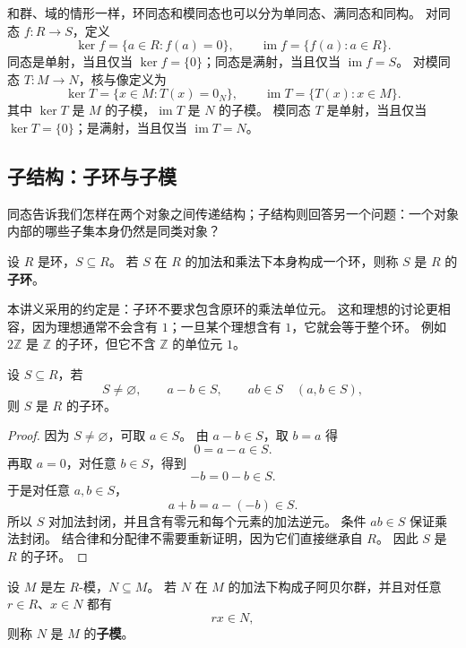 和群、域的情形一样，环同态和模同态也可以分为单同态、满同态和同构。
对同态 $f:R\to S$，定义
\[
\ker f=\{a\in R:f(a)=0\},\qquad
\operatorname{im}f=\{f(a):a\in R\}.
\]
同态是单射，当且仅当 $\ker f=\{0\}$；同态是满射，当且仅当 $\operatorname{im}f=S$。
对模同态 $T:M\to N$，核与像定义为
\[
\ker T=\{x\in M:T(x)=0_N\},\qquad
\operatorname{im}T=\{T(x):x\in M\}.
\]
其中 $\ker T$ 是 $M$ 的子模，$\operatorname{im}T$ 是 $N$ 的子模。
模同态 $T$ 是单射，当且仅当 $\ker T=\{0\}$；是满射，当且仅当 $\operatorname{im}T=N$。

\subsection{子结构：子环与子模}\label{sec:substructures}

同态告诉我们怎样在两个对象之间传递结构；子结构则回答另一个问题：一个对象内部的哪些子集本身仍然是同类对象？

\begin{definition}[子环]\label{def:subring}
设 $R$ 是环，$S\subseteq R$。
若 $S$ 在 $R$ 的加法和乘法下本身构成一个环，则称 $S$ 是 $R$ 的\textbf{子环}。
\end{definition}

本讲义采用的约定是：子环不要求包含原环的乘法单位元。
这和理想的讨论更相容，因为理想通常不会含有 $1$；一旦某个理想含有 $1$，它就会等于整个环。
例如 $2\mathbb Z$ 是 $\mathbb Z$ 的子环，但它不含 $\mathbb Z$ 的单位元 $1$。

\begin{theorem}[子环判定]\label{thm:subring-test}
设 $S\subseteq R$，若
\[
S\neq\varnothing,\qquad a-b\in S,\qquad ab\in S\quad(a,b\in S),
\]
则 $S$ 是 $R$ 的子环。
\end{theorem}

\begin{proof}
因为 $S\neq\varnothing$，可取 $a\in S$。
由 $a-b\in S$，取 $b=a$ 得
\[
0=a-a\in S.
\]
再取 $a=0$，对任意 $b\in S$，得到
\[
-b=0-b\in S.
\]
于是对任意 $a,b\in S$，
\[
a+b=a-(-b)\in S.
\]
所以 $S$ 对加法封闭，并且含有零元和每个元素的加法逆元。
条件 $ab\in S$ 保证乘法封闭。
结合律和分配律不需要重新证明，因为它们直接继承自 $R$。
因此 $S$ 是 $R$ 的子环。
\end{proof}

\begin{definition}[子模]\label{def:submodule}
设 $M$ 是左 $R$-模，$N\subseteq M$。
若 $N$ 在 $M$ 的加法下构成子阿贝尔群，并且对任意 $r\in R$、$x\in N$ 都有
\[
rx\in N,
\]
则称 $N$ 是 $M$ 的\textbf{子模}。
\end{definition}

